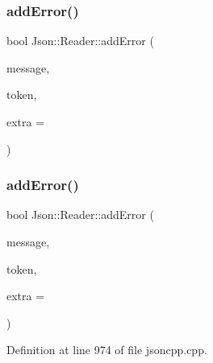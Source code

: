 \subsubsection{\texorpdfstring{add\+Error()}{addError()}\hspace{0.1cm}{\footnotesize\ttfamily [1/2]}}
{\footnotesize\ttfamily bool Json\+::\+Reader\+::add\+Error (\begin{DoxyParamCaption}\item[{const \hyperlink{config_8h_a1e723f95759de062585bc4a8fd3fa4be}{J\+S\+O\+N\+C\+P\+P\+\_\+\+S\+T\+R\+I\+NG} \&}]{message,  }\item[{\hyperlink{class_json_1_1_reader_1_1_token}{Token} \&}]{token,  }\item[{\hyperlink{class_json_1_1_reader_a46795b5b272bf79a7730e406cb96375a}{Location}}]{extra = {} }\end{DoxyParamCaption})\hspace{0.3cm}{\ttfamily [private]}}

\hypertarget{class_json_1_1_reader_af02176a1d2786b4415bbb00a1b10bb6b}{}\label{class_json_1_1_reader_af02176a1d2786b4415bbb00a1b10bb6b} 
\subsubsection{\texorpdfstring{add\+Error()}{addError()}\hspace{0.1cm}{\footnotesize\ttfamily [2/2]}}
{\footnotesize\ttfamily bool Json\+::\+Reader\+::add\+Error (\begin{DoxyParamCaption}\item[{const \hyperlink{config_8h_a1e723f95759de062585bc4a8fd3fa4be}{J\+S\+O\+N\+C\+P\+P\+\_\+\+S\+T\+R\+I\+NG} \&}]{message,  }\item[{\hyperlink{class_json_1_1_reader_1_1_token}{Token} \&}]{token,  }\item[{\hyperlink{class_json_1_1_reader_a46795b5b272bf79a7730e406cb96375a}{Location}}]{extra = {} }\end{DoxyParamCaption})\hspace{0.3cm}{\ttfamily [private]}}



Definition at line 974 of file jsoncpp.\+cpp.

\hypertarget{class_json_1_1_reader_a478db8ac6d00db1409608a37b66bc38d}{}\label{class_json_1_1_reader_a478db8ac6d00db1409608a37b66bc38d} 

